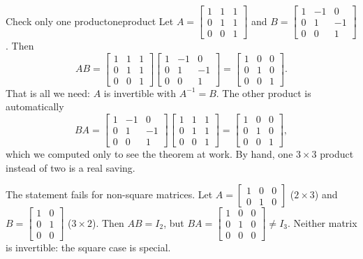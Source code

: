 \documentclass[11pt]{article}
\begin{document}
\begin{exmp}{Check only one product}{oneproduct}
Let $A=\begin{bmatrix}1&1&1\\0&1&1\\0&0&1\end{bmatrix}$ and $B=\begin{bmatrix}1&-1&0\\0&1&-1\\0&0&1\end{bmatrix}$. Then
\[
AB=\begin{bmatrix}1&1&1\\0&1&1\\0&0&1\end{bmatrix}\begin{bmatrix}1&-1&0\\0&1&-1\\0&0&1\end{bmatrix}=\begin{bmatrix}1&0&0\\0&1&0\\0&0&1\end{bmatrix}.
\]
That is all we need: $A$ is invertible with $A^{-1}=B$. The other product is automatically
\[
BA=\begin{bmatrix}1&-1&0\\0&1&-1\\0&0&1\end{bmatrix}\begin{bmatrix}1&1&1\\0&1&1\\0&0&1\end{bmatrix}=\begin{bmatrix}1&0&0\\0&1&0\\0&0&1\end{bmatrix},
\]
which we computed only to see the theorem at work. By hand, one $3\times3$ product instead of two is a real saving.
\end{exmp}

\begin{warn}
The statement fails for non-square matrices. Let $A=\begin{bmatrix}1&0&0\\0&1&0\end{bmatrix}$ ($2\times3$) and $B=\begin{bmatrix}1&0\\0&1\\0&0\end{bmatrix}$ ($3\times2$). Then $AB=I_2$, but $BA=\begin{bmatrix}1&0&0\\0&1&0\\0&0&0\end{bmatrix}\neq I_3$. Neither matrix is invertible: the square case is special.
\end{warn}
\end{document}
